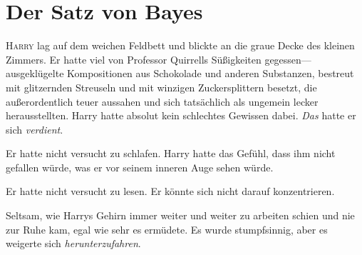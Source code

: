 \chapter{Der Satz von Bayes}


\lettrine{H}{arry} lag auf dem weichen Feldbett und blickte an die graue Decke des kleinen Zimmers. Er hatte viel von Professor Quirrells Süßigkeiten gegessen—ausgeklügelte Kompositionen aus Schokolade und anderen Substanzen, bestreut mit glitzernden Streuseln und mit winzigen Zuckersplittern besetzt, die außerordentlich teuer aussahen und sich tatsächlich als ungemein lecker herausstellten. Harry hatte absolut kein schlechtes Gewissen dabei. \emph{Das} hatte er sich \emph{verdient}.

Er hatte nicht versucht zu schlafen. Harry hatte das Gefühl, dass ihm nicht gefallen würde, was er vor seinem inneren Auge sehen würde.

Er hatte nicht versucht zu lesen. Er könnte sich nicht darauf konzentrieren.

Seltsam, wie Harrys Gehirn immer weiter und weiter zu arbeiten schien und nie zur Ruhe kam, egal wie sehr es ermüdete. Es wurde stumpfsinnig, aber es weigerte sich \emph{herunterzufahren}.

